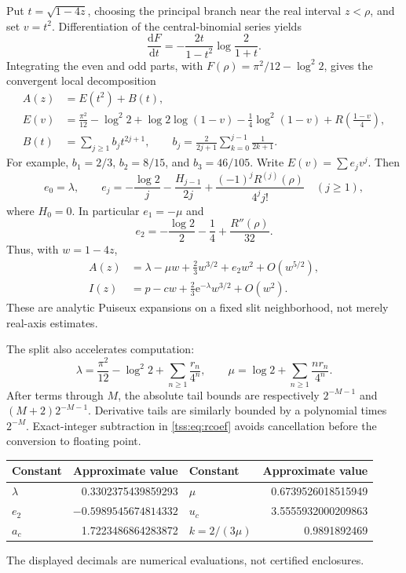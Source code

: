 \documentclass[11pt]{article}
\theoremstyle{remark}\newtheorem{remark}[theorem]{Remark}
\theoremstyle{definition}\newtheorem{definition}[theorem]{Definition}
\newcommand{\dd}{\mathrm d}
\newcommand{\e}{\mathrm e}
\begin{document}
Put $t=\sqrt{1-4z}$, choosing the principal branch near the real interval $z<\rho$, and set $v=t^2$. Differentiation of the central-binomial series yields
\begin{equation}\label{tss:eq:Fderiv}
\frac{\dd F}{\dd t}=-\frac{2t}{1-t^2}\log\frac2{1+t}.
\end{equation}
Integrating the even and odd parts, with $F(\rho)=\pi^2/12-\log^2 2$, gives the convergent local decomposition
\begin{align}
A(z)&=E(t^2)+B(t),\label{tss:eq:EB}\\
E(v)&=\frac{\pi^2}{12}-\log^2 2+\log2\log(1-v)
 -\frac14\log^2(1-v)+R\left(\frac{1-v}4\right),\label{tss:eq:E}\\
B(t)&=\sum_{j\geq1}b_jt^{2j+1},\qquad
 b_j=\frac2{2j+1}\sum_{k=0}^{j-1}\frac1{2k+1}.
 \label{tss:eq:B}
\end{align}
For example, $b_1=2/3$, $b_2=8/15$, and $b_3=46/105$. Write $E(v)=\sum e_jv^j$. Then
\begin{equation}\label{tss:eq:ej}
e_0=\lambda,\qquad
 e_j=-\frac{\log2}{j}-\frac{H_{j-1}}{2j}
       +\frac{(-1)^jR^{(j)}(\rho)}{4^j j!}\quad(j\geq1),
\end{equation}
where $H_0=0$. In particular $e_1=-\mu$ and
\begin{equation}\label{tss:eq:e2}
e_2=-\frac{\log2}{2}-\frac14+\frac{R''(\rho)}{32}.
\end{equation}
Thus, with $w=1-4z$,
\begin{align}
A(z)&=\lambda-\mu w+\frac23w^{3/2}+e_2w^2+O(w^{5/2}),\label{tss:eq:Aexp}\\
I(z)&=p-cw+\frac23\e^{-\lambda}w^{3/2}+O(w^2).
\label{tss:eq:Iexp}
\end{align}
These are analytic Puiseux expansions on a fixed slit neighborhood, not merely real-axis estimates.

The split also accelerates computation:
\begin{equation}\label{tss:eq:fastconstant}
\lambda=\frac{\pi^2}{12}-\log^2 2+\sum_{n\geq1}\frac{r_n}{4^n},\qquad
\mu=\log2+\sum_{n\geq1}\frac{nr_n}{4^n}.
\end{equation}
After terms through $M$, the absolute tail bounds are respectively
$2^{-M-1}$ and $(M+2)2^{-M-1}$. Derivative tails are similarly bounded by a polynomial times $2^{-M}$. Exact-integer subtraction in \eqref{tss:eq:rcoef} avoids cancellation before the conversion to floating point.
\begin{center}
\begin{tabular}{lr@{\qquad}lr}
\toprule
Constant&Approximate value&Constant&Approximate value\\\midrule
$\lambda$&0.3302375439859293&$\mu$&0.6739526018515949\\
$e_2$&$-0.5989545674814332$&$u_c$&3.5555932000209863\\
$a_c$&1.7223486864283872&$k=2/(3\mu)$&0.9891892469\\
\bottomrule
\end{tabular}
\end{center}
The displayed decimals are numerical evaluations, not certified enclosures.
\end{document}
